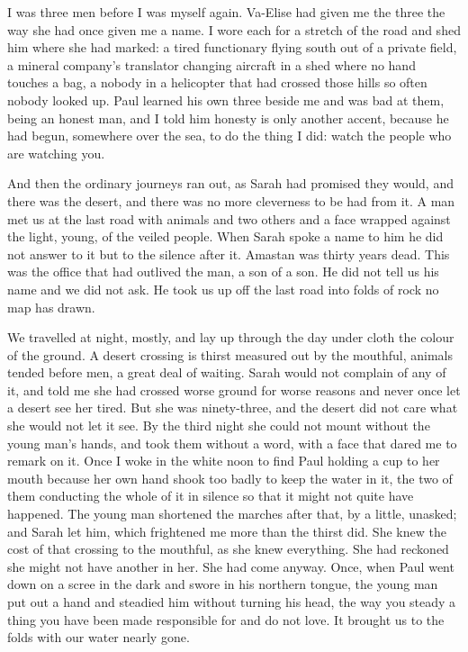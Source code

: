 
I was three men before I was myself again. Va-Elise had given me the three the way she had once given me a name. I wore each for a stretch of the road and shed him where she had marked: a tired functionary flying south out of a private field, a mineral company's translator changing aircraft in a shed where no hand touches a bag, a nobody in a helicopter that had crossed those hills so often nobody looked up. Paul learned his own three beside me and was bad at them, being an honest man, and I told him honesty is only another accent, because he had begun, somewhere over the sea, to do the thing I did: watch the people who are watching you.\par

And then the ordinary journeys ran out, as Sarah had promised they would, and there was the desert, and there was no more cleverness to be had from it. A man met us at the last road with animals and two others and a face wrapped against the light, young, of the veiled people. When Sarah spoke a name to him he did not answer to it but to the silence after it. Amastan was thirty years dead. This was the office that had outlived the man, a son of a son. He did not tell us his name and we did not ask. He took us up off the last road into folds of rock no map has drawn.\par

We travelled at night, mostly, and lay up through the day under cloth the colour of the ground. A desert crossing is thirst measured out by the mouthful, animals tended before men, a great deal of waiting. Sarah would not complain of any of it, and told me she had crossed worse ground for worse reasons and never once let a desert see her tired. But she was ninety-three, and the desert did not care what she would not let it see. By the third night she could not mount without the young man's hands, and took them without a word, with a face that dared me to remark on it. Once I woke in the white noon to find Paul holding a cup to her mouth because her own hand shook too badly to keep the water in it, the two of them conducting the whole of it in silence so that it might not quite have happened. The young man shortened the marches after that, by a little, unasked; and Sarah let him, which frightened me more than the thirst did. She knew the cost of that crossing to the mouthful, as she knew everything. She had reckoned she might not have another in her. She had come anyway. Once, when Paul went down on a scree in the dark and swore in his northern tongue, the young man put out a hand and steadied him without turning his head, the way you steady a thing you have been made responsible for and do not love. It brought us to the folds with our water nearly gone.\par

